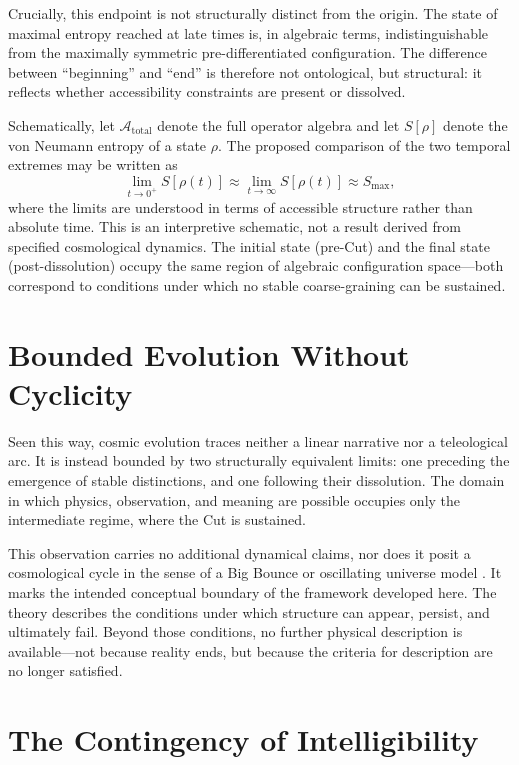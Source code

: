 \documentclass[12pt,a4paper,openany]{book}
\begin{document}
Crucially, this endpoint is not structurally distinct from the origin. The state of maximal entropy reached at late times is, in algebraic terms, indistinguishable from the maximally symmetric pre-differentiated configuration. The difference between ``beginning'' and ``end'' is therefore not ontological, but structural: it reflects whether accessibility constraints are present or dissolved.

Schematically, let $\mathcal{A}_{\text{total}}$ denote the full operator algebra and let $S[\rho]$ denote the von Neumann entropy of a state $\rho$. The proposed comparison of the two temporal extremes may be written as
\begin{equation}
\lim_{t \to 0^+} S[\rho(t)] \approx \lim_{t \to \infty} S[\rho(t)] \approx S_{\max},
\end{equation}
where the limits are understood in terms of accessible structure rather than absolute time. This is an interpretive schematic, not a result derived from specified cosmological dynamics. The initial state (pre-Cut) and the final state (post-dissolution) occupy the same region of algebraic configuration space---both correspond to conditions under which no stable coarse-graining can be sustained.

\section*{Bounded Evolution Without Cyclicity}

Seen this way, cosmic evolution traces neither a linear narrative nor a teleological arc. It is instead bounded by two structurally equivalent limits: one preceding the emergence of stable distinctions, and one following their dissolution. The domain in which physics, observation, and meaning are possible occupies only the intermediate regime, where the Cut is sustained.

This observation carries no additional dynamical claims, nor does it posit a cosmological cycle in the sense of a Big Bounce or oscillating universe model \cite{Penrose2010}. It marks the intended conceptual boundary of the framework developed here. The theory describes the conditions under which structure can appear, persist, and ultimately fail. Beyond those conditions, no further physical description is available---not because reality ends, but because the criteria for description are no longer satisfied.

\section*{The Contingency of Intelligibility}
\end{document}
